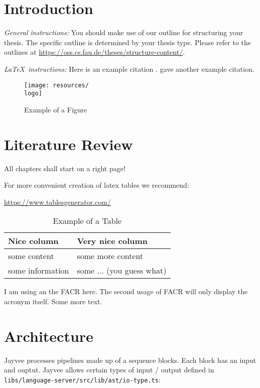 \chapter{Introduction}
\label{chapter:Introduction}

{\textsl{General instructions:}}
You should make use of our outline for structuring your
thesis. The specific outline is determined by your thesis type.
Please refer to the outlines at
\url{https://oss.cs.fau.de/theses/structure-content/}.

{\textsl{\LaTeX\ instructions:}} Here is an example citation
\autocite{riehle:2011:controlling}.
\textcite{riehle:2007:economic} gave another example citation.

\begin{figure}[ht]
	\texttt{[image: resources/\\logo]}
	\caption{Example of a Figure}
	\label{fig:example}
\end{figure}

\chapter{Literature Review}
\label{chapter:Literature}

All chapters shall start on a right page!

For more convenient creation of latex tables we recommend:

\url{https://www.tablesgenerator.com/}

\begin{table}[ht]
	\caption{Example of a Table}
	\label{tab:example}
	\begin{tabular}{|l|l|}
		\hline
		Nice column      & Very nice column          \\
		\hline
		some content     & some more content         \\
		some information & some ... (you guess what) \\
		\hline
	\end{tabular}
\end{table}

I am using an the \ac{FACR} here. The second usage of \ac{FACR} will only display the acronym itself.
\newpage
Some more text.

\chapter{Architecture}
\label{chapter:Architecture}

Jayvee processes pipelines made up of a sequence blocks.
Each block has an input and ouptut.
Jayvee allows certain types of input / output defined in \texttt{libs/language-server/src/lib/ast/io-type.ts}:

